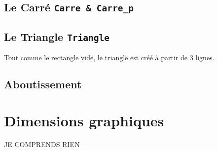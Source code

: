 \documentclass[11pt]{article}
\begin{document}
\subsection{Le Carré \texttt{Carre \& Carre\_p}}


\subsection{Le Triangle \texttt{Triangle}}

Tout comme le rectangle vide, le triangle est créé à partir de 3 lignes.


\subsection{ Aboutissement }


\section{Dimensions graphiques}

JE COMPRENDS RIEN
\end{document}
